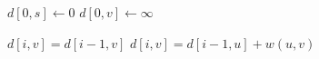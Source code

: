 
\begin{algorithm}[H]
  \begin{algorithmic}[1]
      \State $d[0,s] \gets 0$
	\State $d[0,v] \gets \infty$
      \EndFor

      \hStatex
	  \State $d[i,v] = d[i-1, v]$
	      \State $d[i, v] = d[i-1, u] + w(u, v)$
	    \EndIf
	  \EndFor
	\EndFor
      \EndFor
    \EndProcedure
  \end{algorithmic}
\end{algorithm}
